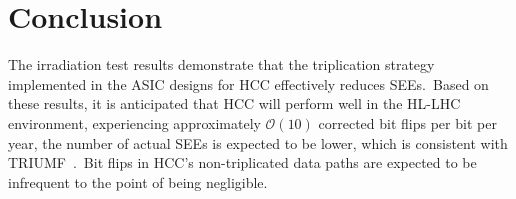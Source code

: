 \documentclass[a4paper,11pt]{article}
\begin{document}
  











\section{Conclusion}

The irradiation test results demonstrate that the triplication strategy implemented in the ASIC designs for HCC effectively reduces SEEs.\ Based on these results, it is anticipated that HCC will perform well in the HL-LHC environment, experiencing approximately $\mathcal{O}(10)$ corrected bit flips per bit per year, the number of actual SEEs is expected to be lower, which is consistent with TRIUMF~\cite{dandoy2023irradiation}.\ Bit flips in HCC’s non-triplicated data paths are expected to be infrequent to the point of being negligible.\


\end{document}

